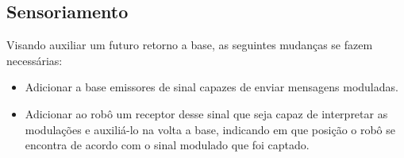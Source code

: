 \subsection{Sensoriamento}
Visando auxiliar um futuro retorno a base, as seguintes mudanças se fazem necessárias:
\begin{itemize}
  \item Adicionar a base emissores de sinal capazes de enviar mensagens moduladas.
  \item Adicionar ao robô um receptor desse sinal que seja capaz de interpretar as modulações e auxiliá-lo na volta a base, indicando em que posição o robô se encontra de acordo com o sinal modulado que foi captado.
\end{itemize}
